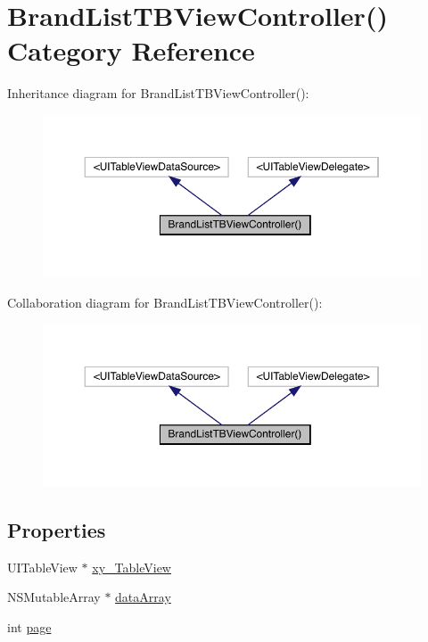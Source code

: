 \hypertarget{category_brand_list_t_b_view_controller_07_08}{}\section{Brand\+List\+T\+B\+View\+Controller() Category Reference}
\label{category_brand_list_t_b_view_controller_07_08}


Inheritance diagram for Brand\+List\+T\+B\+View\+Controller()\+:\nopagebreak
\begin{figure}[H]
\begin{center}
\leavevmode
\includegraphics[width=350pt]{category_brand_list_t_b_view_controller_07_08__inherit__graph}
\end{center}
\end{figure}


Collaboration diagram for Brand\+List\+T\+B\+View\+Controller()\+:\nopagebreak
\begin{figure}[H]
\begin{center}
\leavevmode
\includegraphics[width=350pt]{category_brand_list_t_b_view_controller_07_08__coll__graph}
\end{center}
\end{figure}
\subsection*{Properties}
\begin{DoxyCompactItemize}
\item 
U\+I\+Table\+View $\ast$ \mbox{\hyperlink{category_brand_list_t_b_view_controller_07_08_abef9515179ac7650354a8474d9e5e1ce}{xy\+\_\+\+Table\+View}}
\item 
N\+S\+Mutable\+Array $\ast$ \mbox{\hyperlink{category_brand_list_t_b_view_controller_07_08_a59503c99798e66dcb27aa5491c1d3564}{data\+Array}}
\item 
int \mbox{\hyperlink{category_brand_list_t_b_view_controller_07_08_aa50617b46c608c527a411dc224d2d7ab}{page}}
\end{DoxyCompactItemize}


